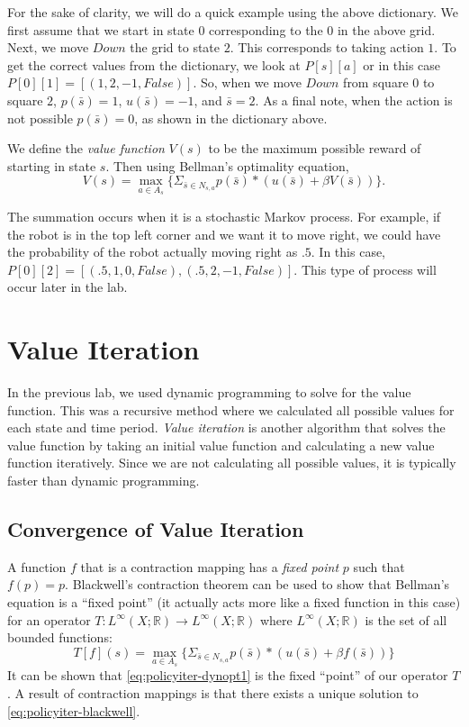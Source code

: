 For the sake of clarity, we will do a quick example using the above dictionary.
We first assume that we start in state $0$ corresponding to the $0$ in the above grid.
Next, we move $Down$ the grid to state $2$.
This corresponds to taking action $1$.
To get the correct values from the dictionary, we look at $P[s][a]$ or in this case $P[0][1] = [(1,2,-1,False)]$. So, when we move $Down$ from square $0$ to square $2$, $p(\bar{s}) = 1$,  $u(\bar{s}) = -1$, and $\bar{s} = 2$.
As a final note, when the action is not possible $p(\bar{s}) = 0$, as shown in the dictionary above.

We define the \emph{value function} $V(s)$ to be the maximum possible reward of starting in state $s$.
Then using Bellman's optimality equation,
\begin{equation}
\label{eq:policyiter-val-func}
V(s) = \max_{a \in A_s} \{\Sigma_{\bar{s}\in N_{s,a}}p(\bar{s}) * \left( u(\bar{s}) + \beta V(\bar{s})\right)\}.
\end{equation}

The summation occurs when it is a stochastic Markov process.
For example, if the robot is in the top left corner and we want it to move right, we could have the probability of the robot actually moving right as $.5$.
In this case, $P[0][2] = [(.5, 1, 0, False), (.5, 2, -1, False)]$.
This type of process will occur later in the lab.

\section*{Value Iteration}

In the previous lab, we used dynamic programming to solve for the value function.
This was a recursive method where we calculated all possible values for each state and time period.
\emph{Value iteration} is another algorithm that solves the value function by taking an initial value function and calculating a new value function iteratively.
Since we are not calculating all possible values, it is typically faster than dynamic programming.

\subsection*{Convergence of Value Iteration}

A function $f$ that is a contraction mapping has a \emph{fixed point} $p$ such that $f(p) = p$.
Blackwell's contraction theorem can be used to show that Bellman's equation is a ``fixed point'' (it actually acts more like a fixed function in this case)
for an operator $T: L^{\infty}(X;\mathbb{R}) \to L^{\infty}(X;\mathbb{R})$ where $L^{\infty}(X;\mathbb{R})$ is the set of all bounded functions:
\begin{equation}
\label{eq:policyiter-blackwell}
T[f](s) = \max_{a \in A_s} \{\Sigma_{\bar{s}\in N_{s,a}} p(\bar{s}) * \left( u(\bar{s}) + \beta f(\bar{s})\right)\}
\end{equation}
It can be shown that \ref{eq:policyiter-dynopt1} is the fixed ``point'' of our operator $T$.
A result of contraction mappings is that there exists a unique solution to \ref{eq:policyiter-blackwell}.


